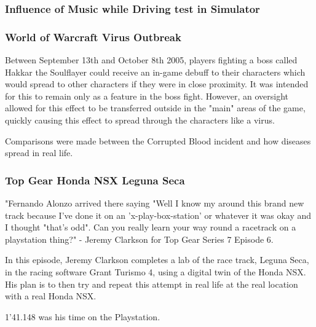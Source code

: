 \documentclass{article}
\begin{document}
\subsubsection{Influence of Music while Driving test in Simulator}


\subsubsection{World of Warcraft Virus Outbreak}

Between September 13th and October 8th 2005, players fighting a boss called Hakkar the Soulflayer could receive an in-game debuff to their characters which would spread to other characters if they were in close proximity. It was intended for this to remain only as a feature in the boss fight. However, an oversight allowed for this effect to be transferred outside in the "main" areas of the game, quickly causing this effect to spread through the characters like a virus. 


Comparisons were made between the Corrupted Blood incident and how diseases spread in real life.

\subsubsection{Top Gear Honda NSX Leguna Seca}

"Fernando Alonzo arrived there saying "Well I know my around this brand new track because I've done it on an 'x-play-box-station' or whatever it was okay and I thought "that's odd". Can you really learn your way round a racetrack on a playstation thing?" - Jeremy Clarkson for Top Gear Series 7 Episode 6.

In this episode, Jeremy Clarkson completes a lab of the race track, Leguna Seca, in the racing software Grant Turismo 4, using a digital twin of the Honda NSX. His plan is to then try and repeat this attempt in real life at the real location with a real Honda NSX.


1'41.148 was his time on the Playstation.
\end{document}
